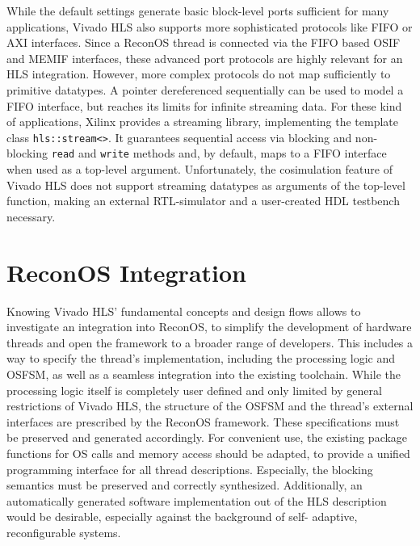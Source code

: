 While the default settings generate basic block-level ports sufficient for
many applications, Vivado HLS also supports more sophisticated protocols like
\ac{FIFO} or \ac{AXI} interfaces. Since a ReconOS thread is connected via
the \ac{FIFO} based \ac{OSIF} and \ac{MEMIF} interfaces, these advanced port
protocols are highly relevant for an \ac{HLS} integration. However, more
complex protocols do not map sufficiently to primitive datatypes. A pointer
dereferenced sequentially can be used to model a \ac{FIFO} interface, but
reaches its limits for infinite streaming data. For these kind of
applications, Xilinx provides a streaming library, implementing the template
class \lstinline{hls::stream<>}. It guarantees sequential access via blocking
and non-blocking \lstinline{read} and \lstinline{write} methods and, by
default, maps to a \ac{FIFO} interface when used as a top-level argument.
Unfortunately, the cosimulation feature of Vivado HLS does not support
streaming datatypes as arguments of the top-level function, making an external
\ac{RTL}-simulator and a user-created \ac{HDL} testbench necessary.

\section{ReconOS Integration}
Knowing Vivado HLS' fundamental concepts and design flows allows to
investigate an integration into ReconOS, to simplify the development of
hardware threads and open the framework to a broader range of developers. This
includes a way to specify the thread's implementation, including the
processing logic and \ac{OSFSM}, as well as a seamless integration into the
existing toolchain. While the processing logic itself is completely user
defined and only limited by general restrictions of Vivado HLS, the structure
of the \ac{OSFSM} and the thread's external interfaces are prescribed by the
ReconOS framework. These specifications must be preserved and generated
accordingly. For convenient use, the existing package functions for
\ac{OS} calls and memory access should be adapted, to provide a unified
programming interface for all thread descriptions. Especially, the blocking
semantics must be preserved and correctly synthesized. Additionally, an
automatically generated software implementation out of the \ac{HLS}
description would be desirable, especially against the background of self-
adaptive, reconfigurable systems.


